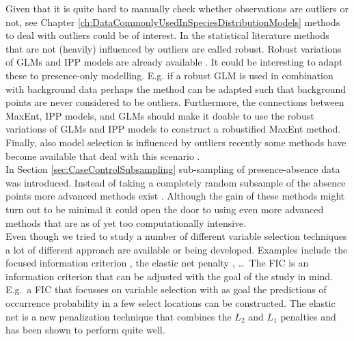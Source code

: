 Given that it is quite hard to manually check whether observations are outliers or not, see Chapter \ref{ch:DataCommonlyUsedInSpeciesDistributionModels} methods to deal with outliers could be of interest. In the statistical literature methods that are not (heavily) influenced by outliers are called robust. Robust variations of GLMs and IPP models are already available \parencite{cantoni_robust_2001, assuncao_robustness_1999}. It could be interesting to adapt these to presence-only modelling. E.g. if a robust GLM is used in combination with background data perhaps the method can be adapted such that background points are never considered to be outliers. Furthermore, the connections between MaxEnt, IPP models, and GLMs should make it doable to use the robust variations of GLMs and IPP models to construct a robustified MaxEnt method. Finally, also model selection is influenced by outliers recently some methods have become available that deal with this scenario \parencite[e.g.][]{muller_robust_2009}. \\

In Section \ref{sec:CaseControlSubsampling} sub-sampling of presence-absence data was introduced. Instead of taking a completely random subsample of the absence points more advanced methods exist \parencite{king_logistic_2001}. Although the gain of these methods might turn out to be minimal it could open the door to using even more advanced methods that are as of yet too computationally intensive. \\

Even though we tried to study a number of different variable selection techniques a lot of different approach are available or being developed. Examples include the focused information criterion \parencite[FIC, ][]{claeskens_focused_2003}, the elastic net penalty \parencite{zou_regularization_2005}, \dots\ The FIC is an information criterion that can be adjusted with the goal of the study in mind. E.g.\ a FIC that focusses on variable selection with as goal the predictions of occurrence probability in a few select locations can be constructed. The elastic net is a new penalization technique that combines the $L_2$ and $L_1$ penalties and has been shown to perform quite well.\\

